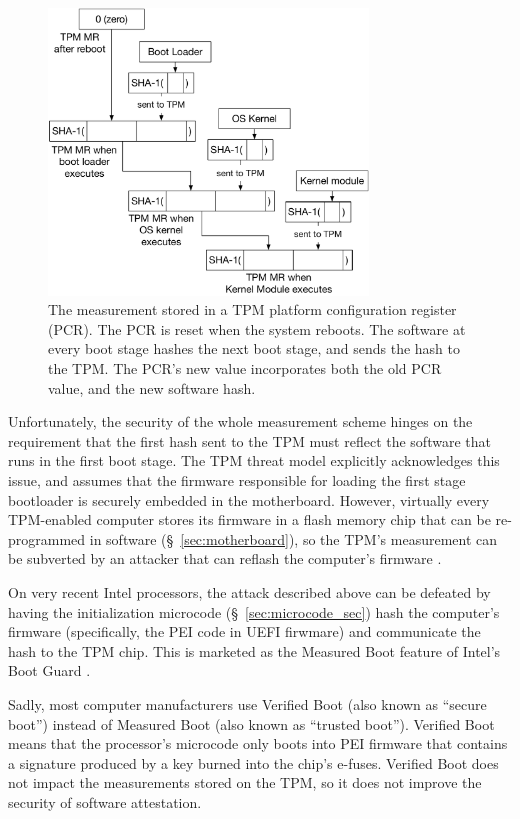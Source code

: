 \begin{figure}[hbt]
  \centering
  \includegraphics[width=85mm]{figures/tpm_measurement.pdf}
  \caption{
    The measurement stored in a TPM platform configuration register (PCR). The
    PCR is reset when the system reboots. The software at every boot stage
    hashes the next boot stage, and sends the hash to the TPM. The PCR's new
    value incorporates both the old PCR value, and the new software hash.
  }
  \label{fig:tpm_measurement}
\end{figure}

Unfortunately, the security of the whole measurement scheme hinges on the
requirement that the first hash sent to the TPM must reflect the software that
runs in the first boot stage. The TPM threat model explicitly acknowledges this
issue, and assumes that the firmware responsible for loading the first stage
bootloader is securely embedded in the motherboard. However, virtually every
TPM-enabled computer stores its firmware in a flash memory chip that can be
re-programmed in software (\S~\ref{sec:motherboard}), so the TPM's measurement
can be subverted by an attacker that can reflash the computer's firmware
\cite{butterworth2013bios}.

On very recent Intel processors, the attack described above can be defeated by
having the initialization microcode (\S~\ref{sec:microcode_sec}) hash the
computer's firmware (specifically, the PEI code in UEFI \cite{forum2015uefi}
firwmare) and communicate the hash to the TPM chip. This is marketed as the
Measured Boot feature of Intel's Boot Guard \cite{ruan2014intelme}.

Sadly, most computer manufacturers use Verified Boot (also known as ``secure
boot'') instead of Measured Boot (also known as ``trusted boot''). Verified
Boot means that the processor's microcode only boots into PEI firmware that
contains a signature produced by a key burned into the chip's e-fuses. Verified
Boot does not impact the measurements stored on the TPM, so it does not improve
the security of software attestation.
